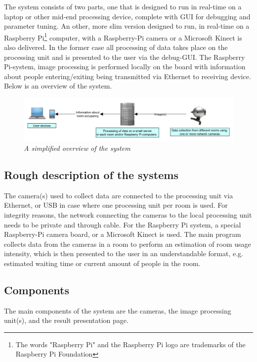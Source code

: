 The system consists of two parts, one that is designed to run in real-time on a laptop or other mid-end processing device, complete with GUI for debugging and parameter tuning. An other, more slim version designed to run, in real-time on a Raspberry Pi\footnote{The words "Raspberry Pi" and the Raspberry Pi logo are trademarks of the Raspberry Pi Foundation} computer, with a Raspberry-Pi camera or a Microsoft Kinect is also delivered. In the former case all processing of data takes place on the processing unit and is presented to the user via the debug-GUI. The Raspberry Pi-system, image processing is performed locally on the board with information about people entering/exiting being transmitted via Ethernet to receiving device. Below is an overview of the system.

\vspace{0.5cm}
\begin{figure}[htb]
	\centering
	\includegraphics[width=170mm]{images/system_overview.png}
	\caption[System overview]{\textit{A simplified overview of the system}}
	\label{fig:block_overview2_fig}  %
\end{figure}

\subsection{Rough description of the systems}
The camera(s) used to collect data are connected to the processing unit via Ethernet, or USB in case where one processing unit per room is used. For integrity reasons, the network connecting the cameras to the local processing unit needs to be private and through cable. For the Raspberry Pi system, a special Raspberry-Pi camera board, or a Microsoft Kinect is used. The main program collects data from the cameras in a room to perform an estimation of room usage intensity, which is then presented to the user in an understandable format, e.g. estimated waiting time or current amount of people in the room.
\newpage
\subsection{Components}
The main components of the system are the cameras, the image processing unit(s), and the result presentation page.

